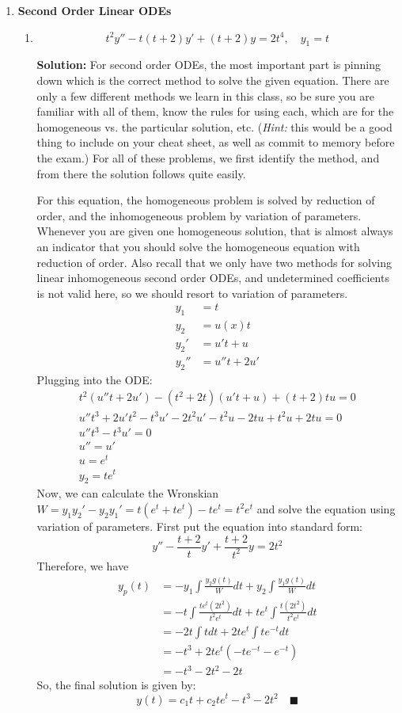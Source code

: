 \documentclass[letterpaper, fontsize=10pt]{scrartcl} %
\numberwithin{equation}{section} %
\numberwithin{figure}{section} %
\numberwithin{table}{section} %
\begin{document}
\begin{enumerate}
\item \textbf{Second Order Linear ODEs}  \begin{enumerate}[label=(\alph*)]
\item \[ t^2y'' - t(t+2)y' +(t+2)y= 2t^4, \quad y_1 = t\]
\par \textbf{Solution:} For second order ODEs, the most important part is pinning down which is the correct method to solve the given equation. There are only a few different methods we learn in this class, so be sure you are familiar with all of them, know the rules for using each, which are for the homogeneous vs. the particular solution, etc. (\textit{Hint:} this would be a good thing to include on your cheat sheet, as well as commit to memory before the exam.) For all of these problems, we first identify the method, and from there the solution follows quite easily. 
\par For this equation, the homogeneous problem is solved by reduction of order, and the inhomogeneous problem by variation of parameters. Whenever you are given one homogeneous solution, that is almost always an indicator that you should solve the homogeneous equation with reduction of order. Also recall that we only have two methods for solving linear inhomogeneous second order ODEs, and undetermined coefficients is not valid here, so we should resort to variation of parameters. 
\begin{align*} 
y_1 &= t\\
y_2 &= u(x)t\\
y_2' &= u' t + u\\
y_2''&= u''t + 2u' 
\end{align*}
Plugging into the ODE:
\begin{gather*}
t^2(u''t + 2u') - (t^2 + 2t)(u't + u) + (t+2)tu = 0\\
u''t^3 + 2u't^2 - t^3u' - 2t^2u' - t^2u-2tu + t^2 u+2tu = 0\\
u''t^3  - t^3u'= 0\\
u'' = u'\\
u = e^t \\
y_2 = te^t
\end{gather*}
Now, we can calculate the Wronskian $W = y_1 y_2' - y_2 y_1' = t(e^t + te^t) - te^t = t^2 e^t$ and solve the equation using variation of parameters. First put the equation into standard form:
\[ y'' -\frac{ t+2}{t}y' +\frac{t+2}{t^2} y= 2t^2 \]
Therefore, we have 
\begin{align*}
y_p(t) &= -y_1 \int \frac{y_2 g(t)}{W}dt + y_2 \int \frac{y_1 g(t)}{W}dt \\
&= -t \int \frac{te^t (2t^2)}{t^2 e^t}dt + te^t \int \frac{t (2t^2)}{t^2 e^t}dt \\
&= -2t \int t dt + 2te^t \int te^{-t} dt \\
&= -t^3 + 2te^t\left( -te^{-t} - e^{-t}\right) \\
&= -t^3 - 2t^2 - 2t 
\end{align*}
So, the final solution is given by:
\[ y(t) = c_1 t + c_2 te^t - t^3 - 2t^2 \quad\blacksquare\]


\end{enumerate}
\end{enumerate}
\end{document}
